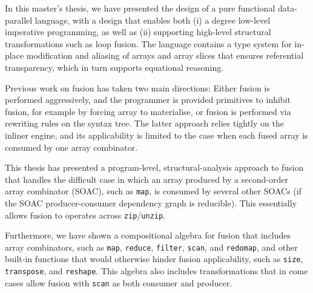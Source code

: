 In this master’s thesis, we have presented the design of a pure
functional data-parallel language, with a design that enables both (i)
a degree low-level imperative programming, as well as (ii) supporting
high-level structural transformations such as loop fusion.  The
language contains a type system for in-place modification and aliasing
of arrays and array slices that ensures referential transparency,
which in turn supports equational reasoning.

Previous work on fusion has taken two main directions: Either fusion
is performed aggressively, and the programmer is provided primitives
to inhibit fusion, for example by forcing array to materialise, or
fusion is performed via rewriting rules on the syntax tree.  The
latter approach relies tightly on the inliner engine, and its
applicability is limited to the case when each fused array is consumed
by one array combinator.

This thesis has presented a program-level, structural-analysis
approach to fusion that handles the difficult case in which an array
produced by a second-order array combinator (SOAC), such as
\texttt{map}, is consumed by several other SOACs (if the SOAC
producer-consumer dependency graph is reducible).  This essentially
allows fusion to operates across \texttt{zip}/\texttt{unzip}.

Furthermore, we have shown a compositional algebra for fusion that
includes array combinators, such as \texttt{map}, \texttt{reduce},
\texttt{filter}, \texttt{scan}, and \texttt{redomap}, and other
built-in functions that would otherwise hinder fusion applicability,
such as \texttt{size}, \texttt{transpose}, and \texttt{reshape}.  This
algebra also includes transformations that in come cases allow fusion
with \texttt{scan} as both consumer and producer.

